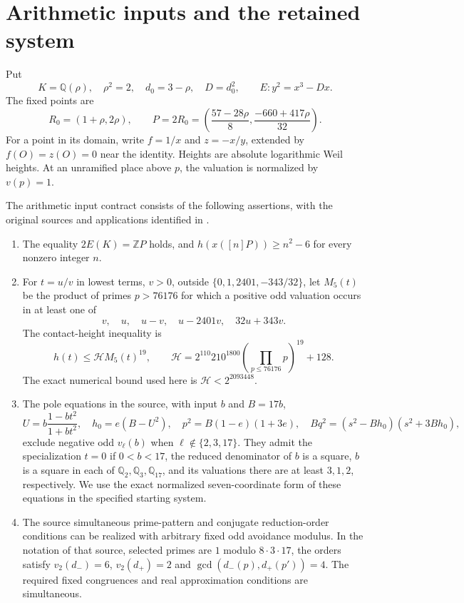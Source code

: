 \documentclass[11pt,a4paper]{article}
\theoremstyle{definition}\newtheorem{definition}[theorem]{Definition}
\theoremstyle{remark}\newtheorem{remark}[theorem]{Remark}
\newcommand{\Q}{\mathbb Q}\newcommand{\Z}{\mathbb Z}
\newcommand{\HH}{\mathcal H}\newcommand{\ord}{\operatorname{ord}}
\begin{document}
\section{Arithmetic inputs and the retained system}\label{sec:inputs}
Put
\[
 K=\Q(\rho),\quad \rho^2=2,\quad d_0=3-\rho,\quad D=d_0^2,
 \qquad E:y^2=x^3-Dx.
\]
The fixed points are
\[
 R_0=(1+\rho,2\rho),\qquad
 P=2R_0=\left(\frac{57-28\rho}{8},\frac{-660+417\rho}{32}\right).
\]
For a point in its domain, write $f=1/x$ and $z=-x/y$, extended by
$f(O)=z(O)=0$ near the identity. Heights are absolute logarithmic Weil
heights. At an unramified place above $p$, the valuation is normalized by
$v(p)=1$.

The arithmetic input contract consists of the following assertions,
with the original sources and applications identified in
\cite[Sections \nolinkurl{subsec:v12-inputs} and
\nolinkurl{sec:v13}]{GlazerV13}.
\begin{enumerate}
\item The equality $2E(K)=\Z P$ holds, and
$h(x([n]P))\ge n^2-6$ for every nonzero integer $n$.
\item For $t=u/v$ in lowest terms, $v>0$, outside
$\{0,1,2401,-343/32\}$, let $M_5(t)$ be the product of primes
$p>76176$ for which a positive odd valuation occurs in at least one of
\[
 v,\quad u,\quad u-v,\quad u-2401v,\quad32u+343v.
\]
The contact-height inequality is
\[
 h(t)\le\HH M_5(t)^{19},\qquad
 \HH=2^{110}210^{1800}\left(\prod_{p\le76176}p\right)^{19}+128.
\]
The exact numerical bound used here is $\HH<2^{2093448}$.
\item The pole equations in the source, with input $b$ and $B=17b$,
\[
 U=b\frac{1-bt^2}{1+bt^2},\quad h_0=e(B-U^2),\quad
 p^2=B(1-e)(1+3e),\quad
 Bq^2=(s^2-Bh_0)(s^2+3Bh_0),
\]
exclude negative odd $v_\ell(b)$ when $\ell\notin\{2,3,17\}$.
They admit the specialization $t=0$ if $0<b<17$, the reduced denominator
of $b$ is a square, $b$ is a square in each of $\Q_2,\Q_3,\Q_{17}$,
and its valuations there are at least $3,1,2$, respectively. We use
the exact normalized seven-coordinate form of these equations in the
specified starting system.
\item The source simultaneous prime-pattern and conjugate reduction-order
conditions can be realized with arbitrary fixed odd avoidance modulus.
In the notation of that source, selected primes are $1$ modulo
$8\cdot3\cdot17$, the orders satisfy
$v_2(d_-)=6$, $v_2(d_+)=2$ and
$\gcd(d_-(p),d_+(p'))=4$. The required fixed congruences and real
approximation conditions are simultaneous.
\end{enumerate}
\end{document}
